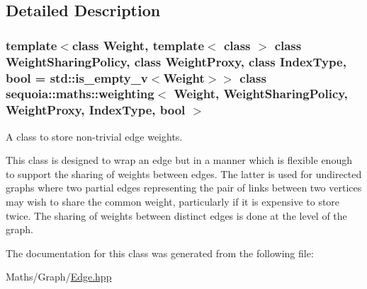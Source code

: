 \subsection{Detailed Description}
\subsubsection*{template$<$class Weight, template$<$ class $>$ class Weight\+Sharing\+Policy, class Weight\+Proxy, class Index\+Type, bool = std\+::is\+\_\+empty\+\_\+v$<$\+Weight$>$$>$\newline
class sequoia\+::maths\+::weighting$<$ Weight, Weight\+Sharing\+Policy, Weight\+Proxy, Index\+Type, bool $>$}

A class to store non-\/trivial edge weights. 

This class is designed to wrap an edge but in a manner which is flexible enough to support the sharing of weights between edges. The latter is used for undirected graphs where two partial edges representing the pair of links between two vertices may wish to share the common weight, particularly if it is expensive to store twice. The sharing of weights between distinct edges is done at the level of the graph. 

The documentation for this class was generated from the following file\+:\begin{DoxyCompactItemize}
\item 
Maths/\+Graph/\mbox{\hyperlink{_edge_8hpp}{Edge.\+hpp}}\end{DoxyCompactItemize}
